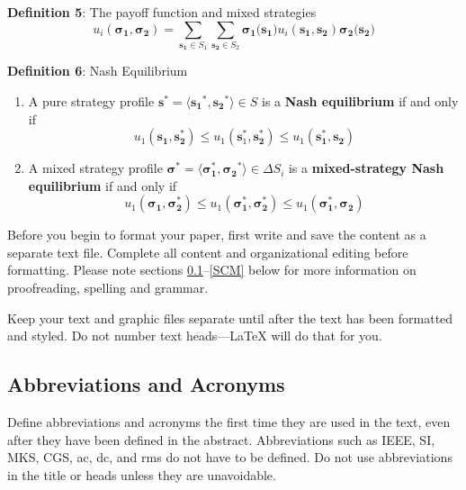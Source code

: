 \documentclass[conference]{IEEEtran}
\begin{document}
\textbf{Definition 5}: The payoff function and mixed strategies
$$ u_i(\boldsymbol{\sigma_1}, \boldsymbol{\sigma_2}) = \displaystyle\sum_{\boldsymbol{s_1} \in S_1}\sum_{\boldsymbol{s_{2}} \in S_{2}}\boldsymbol{\sigma_1}(\boldsymbol{s_1)}u_i(\boldsymbol{s_1}, \boldsymbol{s_{2}})\boldsymbol{\sigma_{2}}(\boldsymbol{s_{2})}$$


\textbf{Definition 6}: Nash Equilibrium
\begin{enumerate}

\item A pure strategy profile $\boldsymbol{s}^* = \langle\boldsymbol{s_1}^*, \boldsymbol{s_2}^*\rangle \in S$ is a \textbf{Nash equilibrium} if and only if $$u_1(\boldsymbol{s_1}, \boldsymbol{s_{2}^*}) \leq u_1(\boldsymbol{s}_1^*, \boldsymbol{s_2^*}) \leq u_1(\boldsymbol{s_1^*}, \boldsymbol{s_2}) $$
\item A mixed strategy profile $\boldsymbol{\sigma^*} = \langle\boldsymbol{\sigma_1^*}, \boldsymbol{\sigma_2}^*\rangle \in \Delta S_i$ is a \textbf{mixed-strategy Nash equilibrium} if and only if $$u_1(\boldsymbol{\sigma_1}, \boldsymbol{\sigma_2^*}) \leq u_1(\boldsymbol{\sigma_1^*}, \boldsymbol{\sigma_2^*}) \leq u_1(\boldsymbol{\sigma_1^*}, \boldsymbol{\sigma_2}) $$

\end{enumerate}

Before you begin to format your paper, first write and save the content as a 
separate text file. Complete all content and organizational editing before 
formatting. Please note sections \ref{AA}--\ref{SCM} below for more information on 
proofreading, spelling and grammar.

Keep your text and graphic files separate until after the text has been 
formatted and styled. Do not number text heads---{\LaTeX} will do that 
for you.

\subsection{Abbreviations and Acronyms}\label{AA}
Define abbreviations and acronyms the first time they are used in the text, 
even after they have been defined in the abstract. Abbreviations such as 
IEEE, SI, MKS, CGS, ac, dc, and rms do not have to be defined. Do not use 
abbreviations in the title or heads unless they are unavoidable.
\end{document}
